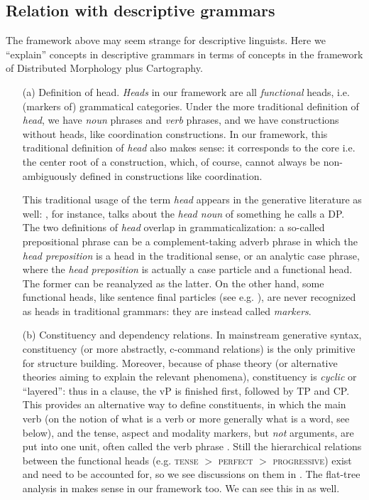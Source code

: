 \documentclass[UTF8, a4paper, oneside, scheme=plain, 12pt]{ctexrep}
\newcommand*{\citepage}[1]{p.~{#1}}
\newcommand*{\citepages}[1]{pp.~{#1}}
\newcommand*{\textgt}{$>$ }
\newcommand*{\term}[1]{\emph{#1}}
\newcommand*{\category}[1]{\textsc{#1}}
\begin{document}
{\subsection{Relation with descriptive grammars}

The framework above may seem strange for descriptive linguists.
Here we ``explain'' concepts in descriptive grammars in terms of concepts in the framework
of Distributed Morphology plus Cartography.

\begin{itemize}
    \item[(a)] Definition of head. \term{Heads} in our framework are all \emph{functional} heads,
    i.e. (markers of) grammatical categories.
    Under the more traditional definition of \term{head},
    we have \emph{noun} phrases and \emph{verb} phrases,
    and we have constructions without heads, like coordination constructions.
    In our framework, this traditional definition of \term{head} also makes sense:
    it corresponds to the core i.e. the center root of a construction,
    which, of course, cannot always be non-ambiguously defined in constructions like coordination.

    This traditional usage of the term \term{head} appears in the generative literature as well:
    \citet[\citepage{120}]{paul2014new}, for instance, talks about the \term{head noun} of something he calls a DP.
    The two definitions of \term{head} overlap in grammaticalization:
    a so-called prepositional phrase can be a complement-taking adverb phrase
    in which the \term{head preposition} is a head in the traditional sense,
    or an analytic case phrase, where the \term{head preposition} is actually a case particle and a functional head.
    The former can be reanalyzed as the latter.
    On the other hand, some functional heads, like sentence final particles
    (see e.g. ),
    are never recognized as heads in traditional grammars:
    they are instead called \term{markers}.

    \item[(b)] Constituency and dependency relations.
    In mainstream generative syntax, constituency (or more abstractly, c-command relations) is the only primitive for structure building.
    Moreover, because of phase theory (or alternative theories aiming to explain the relevant phenomena),
    constituency is \term{cyclic} or ``layered'':
    thus in a clause, the vP is finished first, followed by TP and CP.
    This provides an alternative way to define constituents,
    in which the main verb (on the notion of what is a verb or more generally what is a word, see below),
    and the tense, aspect and modality markers, but \emph{not} arguments, are put into one unit,
    often called the verb phrase \citep[\citepage{39}]{quirk1985}.
    Still the hierarchical relations between the functional heads 
    (e.g. \category{tense} \textgt{}\category{perfect} \textgt{}\category{progressive})
    exist and need to be accounted for, so we see discussions on them in \citet[\citepages{79,121}]{quirk1985}.
    The flat-tree analysis in \citep[\citepage{39}]{quirk1985} makes sense in our framework too.
    We can see this in  as well.
    

\end{itemize}}
\end{document}

